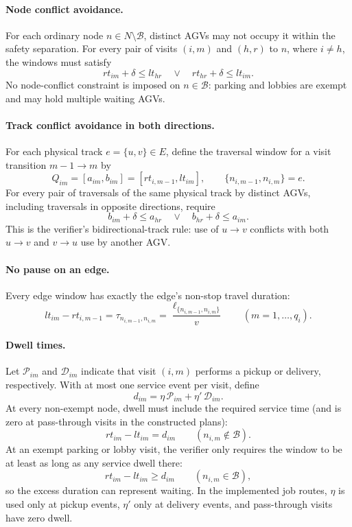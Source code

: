 \paragraph{Node conflict avoidance.}
For each ordinary node $n\in N\setminus\mathcal{B}$, distinct AGVs may not
occupy it within the safety separation. For every pair of visits $(i,m)$ and
$(h,r)$ to $n$, where $i\ne h$, the windows must satisfy
\[
  rt_{im}+\delta\le lt_{hr}
  \quad\lor\quad
  rt_{hr}+\delta\le lt_{im}.
\]
No node-conflict constraint is imposed on $n\in\mathcal{B}$: parking and
lobbies are exempt and may hold multiple waiting AGVs.

\paragraph{Track conflict avoidance in both directions.}
For each physical track $e=\{u,v\}\in E$, define the traversal window for a
visit transition $m-1\to m$ by
\[
  Q_{im}=[a_{im},b_{im}]
  =[rt_{i,m-1},lt_{im}],
  \qquad \{n_{i,m-1},n_{i,m}\}=e.
\]
For every pair of traversals of the same physical track by distinct AGVs,
including traversals in opposite directions, require
\[
  b_{im}+\delta\le a_{hr}
  \quad\lor\quad
  b_{hr}+\delta\le a_{im}.
\]
This is the verifier's bidirectional-track rule: use of $u\to v$ conflicts
with both $u\to v$ and $v\to u$ use by another AGV.

\paragraph{No pause on an edge.}
Every edge window has exactly the edge's non-stop travel duration:
\[
  lt_{im}-rt_{i,m-1}
  =\tau_{n_{i,m-1},n_{i,m}}
  =\frac{\ell_{\{n_{i,m-1},n_{i,m}\}}}{v}
  \qquad (m=1,\ldots,q_i).
\]

\paragraph{Dwell times.}
Let $\mathcal{P}_{im}$ and $\mathcal{D}_{im}$ indicate that visit $(i,m)$
performs a pickup or delivery, respectively. With at most one service event
per visit, define
\[
  d_{im}=\eta\,\mathcal{P}_{im}+\eta'\,\mathcal{D}_{im}.
\]
At every non-exempt node, dwell must include the required service time (and is
zero at pass-through visits in the constructed plans):
\[
  rt_{im}-lt_{im}=d_{im}
  \qquad(n_{i,m}\notin\mathcal{B}).
\]
At an exempt parking or lobby visit, the verifier only requires the window to
be at least as long as any service dwell there:
\[
  rt_{im}-lt_{im}\ge d_{im}
  \qquad(n_{i,m}\in\mathcal{B}),
\]
so the excess duration can represent waiting. In the implemented job routes,
$\eta$ is used only at pickup events, $\eta'$ only at delivery events, and
pass-through visits have zero dwell.

